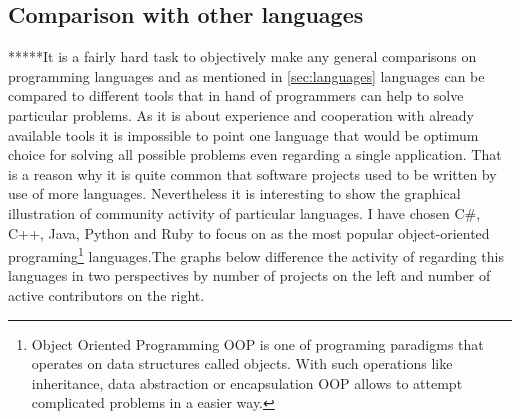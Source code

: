 \subsection{Comparison with other languages}\label{subsec:lang_compare}
*****It is a fairly hard task to objectively make any general comparisons on programming languages and as mentioned in \ref{sec:languages} languages can be compared to different tools that in hand of programmers can help to solve particular problems. As it is about experience and cooperation with already available tools it is impossible to point one language that would be optimum choice for solving all possible problems even regarding a single application. That is a reason why it is quite common that software projects used to be written by use of more languages. Nevertheless it is interesting to show the graphical illustration of community activity of particular languages. I have chosen C\#, C++, Java, Python and Ruby to focus on as the most popular object-oriented programing\footnote{Object Oriented Programming OOP is one of programing paradigms that operates on data structures called objects. With such operations like inheritance, data abstraction or encapsulation OOP allows to attempt complicated problems in a easier way.} languages.\newpage The graphs below difference the activity of regarding  this languages in two perspectives by number of projects on the left and number of active contributors on the right.
